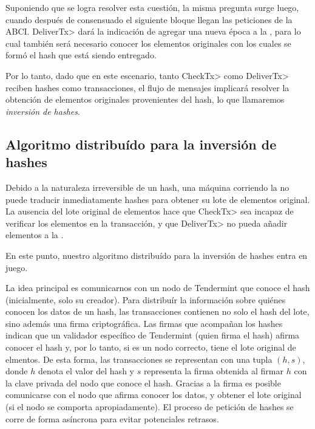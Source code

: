 %

Suponiendo que se logra resolver esta cuestión, la misma pregunta surge luego,
cuando después de consensuado el siguiente bloque llegan las peticiones de la ABCI.
%
\<DeliverTx> dará la indicación de agregar una nueva época a la \setchain, para lo cual también
será necesario conocer los elementos originales con los cuales se formó el hash que está siendo entregado.

Por lo tanto, dado que en este escenario, tanto \<CheckTx> como \<DeliverTx> reciben hashes como transacciones,
el flujo de mensajes implicará resolver la obtención de elementos originales provenientes del hash, lo que llamaremos
\textit{inversión de hashes}.


\subsection{Algoritmo distribuído para la inversión de hashes}

%
%
Debido a la naturaleza irreversible de un hash, una máquina corriendo la \setchain no puede traducir
inmediatamente hashes para obtener su lote de elementos original.
%
La ausencia del lote original de elementos hace que \<CheckTx> sea incapaz de verificar los elementos
en la transacción, y que \<DeliverTx> no pueda añadir elementos a la \setchain.
%

En este punto, nuestro algoritmo distribuído para la inversión de hashes entra en juego.
%

La idea principal es comunicarnos con un nodo de Tendermint que conoce el hash (inicialmente, solo su creador).
%
Para distribuír la información sobre quiénes conocen los datos de un hash, las transacciones contienen
no solo el hash del lote, sino además una firma criptográfica.
%
Las firmas que acompañan los hashes indican que un validador específico de Tendermint
(quien firma el hash) afirma conocer el hash y, por lo tanto, si es un nodo correcto,
tiene el lote original de elmentos.
%
De esta forma, las transacciones se representan con una tupla $(h, s)$, donde $h$ denota
el valor del hash y $s$ representa la firma obtenida al firmar $h$ con la clave privada
del nodo que conoce el hash.
%
Gracias a la firma es posible comunicarse con el nodo que afirma conocer los datos, y obtener
el lote original (si el nodo se comporta apropiadamente).
%
El proceso de petición de hashes se corre de forma asíncrona para evitar potenciales
retrasos.

